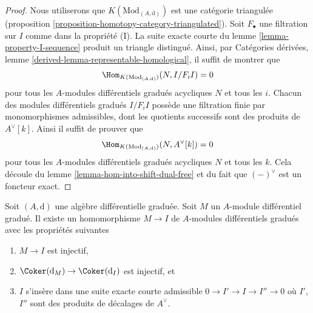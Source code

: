 \begin{proof}
Nous utiliserons que $K(\text{Mod}_{(A, \text{d})})$ est une
catégorie triangulée (proposition \ref{proposition-homotopy-category-triangulated}).
Soit $F_\bullet$ une filtration sur $I$ comme dans la
propriété (I). La suite exacte courte du lemme
\ref{lemma-property-I-sequence} produit un triangle distingué. Ainsi, par
Catégories dérivées, lemme \ref{derived-lemma-representable-homological}, il
suffit de montrer que
$$
\Hom_{K(\text{Mod}_{(A, \text{d})})}(N, I/F_iI) = 0
$$
pour tous les $A$-modules différentiels gradués acycliques $N$ et tous les
$i$. Chacun des modules différentiels gradués $I/F_iI$ possède une filtration finie
par monomorphismes admissibles, dont les quotients successifs
sont des produits de $A^\vee[k]$. Ainsi il suffit de prouver que
$$
\Hom_{K(\text{Mod}_{(A, \text{d})})}(N, A^\vee[k]) = 0
$$
pour tous les $A$-modules différentiels gradués acycliques $N$ et
tous les $k$. Cela découle du lemme
\ref{lemma-hom-into-shift-dual-free} et du fait que $(-)^\vee$ est un foncteur exact.
\end{proof}

\begin{lemma}
\label{lemma-good-sub}
Soit $(A, \text{d})$ une algèbre différentielle
graduée. Soit $M$ un $A$-module différentiel gradué. Il existe un homomorphisme
$M \to I$ de $A$-modules différentiels gradués avec les propriétés
suivantes
\begin{enumerate}
\item $M \to I$ est injectif,
\item $\Coker(\text{d}_M) \to \Coker(\text{d}_I)$ est injectif,
et
\item $I$ s'insère dans une suite exacte courte
admissible $0 \to I' \to I \to I'' \to 0$ où $I'$, $I''$ sont des produits
de décalages de $A^\vee$.
\end{enumerate}
\end{lemma}

